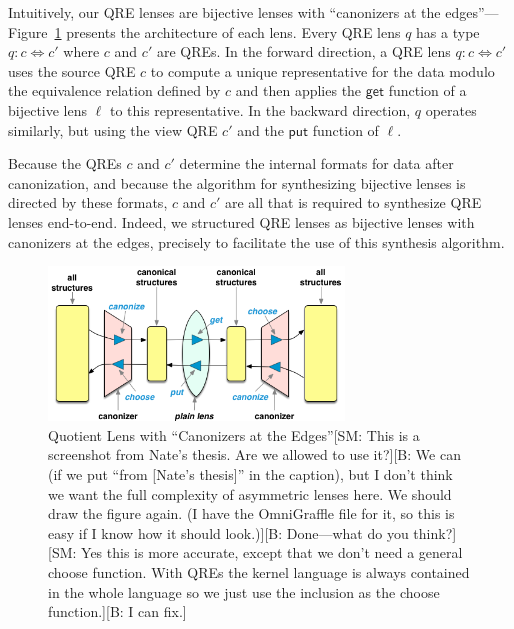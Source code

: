 \documentclass[acmsmall,review,anonymous]{acmart}\settopmatter{printfolios=true,printccs=false,printacmref=false}
\newcommand{\FINISH}[3]{\ifdraft\textcolor{#1}{[#2: #3]}\fi}
\newcommand{\bcp}[1]{\FINISH{dkred}{B}{#1}}
\newcommand{\sam}[1]{\FINISH{dkpurple}{SM}{#1}}
\newcommand{\kw}[1]{\ensuremath{\mathsf{#1}}}
\newcommand{\get}{\ensuremath{\kw{get}}}
\newcommand{\lput}{\ensuremath{\kw{put}}}
\begin{document}
Intuitively, our QRE lenses are bijective lenses with ``canonizers at the
edges''---Figure~\ref{fig:attheedges} presents the architecture of each lens.
Every QRE lens $q$ has a type $q: c \Leftrightarrow c'$ where $c$ and $c'$ are QREs.
In the forward direction, a QRE lens $q: c \Leftrightarrow c'$ uses the source
QRE $c$ to compute a unique representative for the data modulo the equivalence
relation defined by $c$ and then applies the $\get$ function of a bijective
lens $\ell$ to this representative. In the backward direction, $q$ operates
similarly,  but using the view QRE $c'$ and the $\lput$ function of $\ell$.

Because the QREs $c$ and $c'$ determine the internal formats for data after
canonization, and because the algorithm for synthesizing bijective lenses is
directed by these formats, $c$ and $c'$ are all that is required to synthesize
QRE lenses end-to-end.  Indeed, we structured QRE lenses as bijective lenses with
canonizers at the edges, precisely to facilitate the use of this synthesis algorithm.

\begin{figure}[t]
\centering
\includegraphics[width=0.7\textwidth]{canonizers-outside}
\caption{Quotient Lens with ``Canonizers at the Edges''\sam{This is a
screenshot from Nate's thesis. Are we allowed to use it?}\bcp{We can
(if we put ``from [Nate's thesis]'' in the caption), but I don't think
we want the full complexity of asymmetric lenses here.  We should draw
the figure again.  (I have the OmniGraffle file for it, so this is
easy if I know how it should look.)}\bcp{Done---what do you think?}
\sam{Yes this is more accurate, except that we don't need a general choose
function. With QREs the kernel language is always contained in the whole
language so we just use the inclusion as the choose function.}\bcp{I can
fix.}} 
\label{fig:attheedges}
\end{figure}

\end{document}
